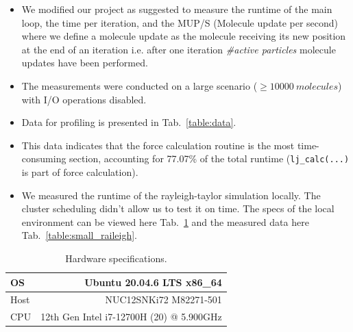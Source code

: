 \documentclass{article}
\begin{document}
\begin{itemize}
    \item We modified our project as suggested to measure the runtime of the main loop, the time per iteration, and the MUP/S (Molecule update per second) where we define a molecule update as the molecule receiving its new position at the end of an iteration i.e. after one iteration \textit{\#active particles} molecule updates have been performed.
    \item The measurements were conducted on a large scenario ($\geq 10000\ molecules$) with I/O operations disabled.
    \item Data for profiling is presented in Tab.\ \ref{table:data}.
    \item This data indicates that the force calculation routine is the most time-consuming section, accounting for 77.07\% of the total runtime (\texttt{lj\_calc(...)} is part of force calculation).
    \item We measured the runtime of the rayleigh-taylor simulation locally. The cluster scheduling didn't allow us to test it on time. The specs of the local environment can be viewed here Tab.\ \ref{table:specs} and the measured data here Tab.\ \ref{table:small_raileigh}.
\end{itemize}

\begin{table}[h!]
    \centering
    \begin{tabular}{|l|r|}
        \hline
        OS & Ubuntu 20.04.6 LTS x86\_64 \\ \hline
        Host & NUC12SNKi72 M82271-501 \\ \hline
        CPU & 12th Gen Intel i7-12700H (20) @ 5.900GHz \\ \hline
    \end{tabular}
    \caption{Hardware specifications.}
    \label{table:specs}
\end{table}
\end{document}
